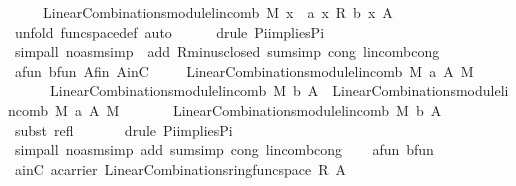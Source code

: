 \begin{isabellebody}
\ \ \ \ {\isacharequal}\ LinearCombinations{\isachardot}module{\isachardot}lincomb\ M\ {\isacharparenleft}{\isasymlambda}x{\isachardot}\ \ a\ x\ {\isasymoplus}\isactrlbsub R\isactrlesub \ b\ x{\isacharparenright}\ A{\isachardoublequoteclose}\isanewline
\ \ \ \ \isamarkupfalse%
\ {\isacharparenleft}unfold\ func{\isacharunderscore}space{\isacharunderscore}def{\isacharcomma}\ auto{\isacharparenright}\isanewline
\ \ \ \ \isamarkupfalse%
\ {\isacharparenleft}drule\ Pi{\isacharunderscore}implies{\isacharunderscore}Pi{}{\isacharparenright}{\isacharplus}\ \isanewline
\ \ \ \ \isamarkupfalse%
\ {\isacharparenleft}simp{\isacharunderscore}all\ {\isacharparenleft}no{\isacharunderscore}asm{\isacharunderscore}simp{\isacharparenright}\ \ add{\isacharcolon}\ R{\isachardot}minus{\isacharunderscore}closed\ sum{\isacharunderscore}simp\ cong{\isacharcolon}\ lincomb{\isacharunderscore}cong{\isacharparenright}\isanewline
\ \ \isamarkupfalse%
\ a{\isacharunderscore}fun\ b{\isacharunderscore}fun\ A{\isacharunderscore}fin\ AinC\isanewline
\ \ \isamarkupfalse%
\ {}{\isacharcolon}\ {\isachardoublequoteopen}LinearCombinations{\isachardot}module{\isachardot}lincomb\ M\ {\isacharquery}a\ A\ {\isasymoplus}\isactrlbsub M\isactrlesub \ \isanewline
\ \ \ \ \ \ LinearCombinations{\isachardot}module{\isachardot}lincomb\ M\ {\isacharquery}b\ A\ {\isacharequal}\ LinearCombinations{\isachardot}module{\isachardot}lincomb\ M\ a\ A\ {\isasymoplus}\isactrlbsub M\isactrlesub \ \isanewline
\ \ \ \ \ \ LinearCombinations{\isachardot}module{\isachardot}lincomb\ M\ b\ A{\isachardoublequoteclose}\isanewline
\ \ \ \ \isamarkupfalse%
\ {\isacharparenleft}subst\ refl{\isacharparenright}\ \isanewline
\ \ \ \ \isamarkupfalse%
\ {\isacharparenleft}drule\ Pi{\isacharunderscore}implies{\isacharunderscore}Pi{}{\isacharparenright}{\isacharplus}\ \isanewline
\ \ \ \ \isamarkupfalse%
\ {\isacharparenleft}simp{\isacharunderscore}all\ {\isacharparenleft}no{\isacharunderscore}asm{\isacharunderscore}simp{\isacharparenright}\ add{\isacharcolon}\ sum{\isacharunderscore}simp\ cong{\isacharcolon}\ lincomb{\isacharunderscore}cong{\isacharparenright}\isanewline
\ \ \isamarkupfalse%
\ a{\isacharunderscore}fun\ b{\isacharunderscore}fun\ \isamarkupfalse%
\ ainC{\isacharcolon}\ {\isachardoublequoteopen}{\isacharquery}a{\isasymin}carrier\ {\isacharparenleft}LinearCombinations{\isachardot}ring{\isachardot}func{\isacharunderscore}space\ R\ A{\isacharparenright}{\isachardoublequoteclose}\ \isanewline

\end{isabellebody}
